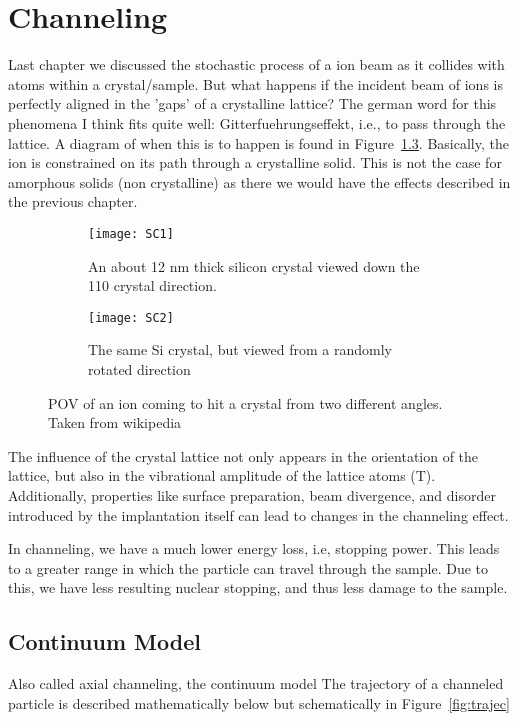 
\chapter{Channeling}\label{ch:channeling}

Last chapter we discussed the stochastic process of a ion beam as it collides with atoms within a crystal/sample.
But what happens if the incident beam of ions is perfectly aligned in the 'gaps' of a crystalline lattice?
The german word for this phenomena I think fits quite well: Gitterfuehrungseffekt, i.e., to pass through the lattice.
A diagram of when this is to happen is found in Figure~\ref{fig:channel1}.
Basically, the ion is constrained on its path through a crystalline solid.
This is not the case for amorphous solids (non crystalline) as there we would have the effects described in the previous chapter.
\begin{figure}
	\begin{subfigure}{0.5\textwidth}
		\texttt{[image: SC1]}
		\caption{An about 12 nm thick silicon crystal viewed down the 110 crystal direction.}
		\label{fig:SC1}
	\end{subfigure}
	\begin{subfigure}{0.5\textwidth}
		\texttt{[image: SC2]}
		\caption{The same Si crystal, but viewed from a randomly rotated direction}
		\label{fig:SC2}
	\end{subfigure}
	\caption{POV of an ion coming to hit a crystal from two different angles. Taken from wikipedia}
	\label{fig:channel1}
\end{figure}
 The influence of the crystal lattice not only appears in the orientation of the lattice, but also in the vibrational amplitude of the lattice atoms (T).
Additionally, properties like surface preparation, beam divergence, and disorder introduced by the implantation itself can lead to changes in the channeling effect.

In channeling, we have a much lower energy loss, i.e, stopping power.
This leads to a greater range in which the particle can travel through the sample.
Due to this, we have less resulting nuclear stopping, and thus less damage to the sample.
\section{Continuum Model}\label{sec:continuum-model}
Also called axial channeling, the continuum model
The trajectory of a channeled particle is described mathematically below but schematically in Figure~\ref{fig:trajec}

